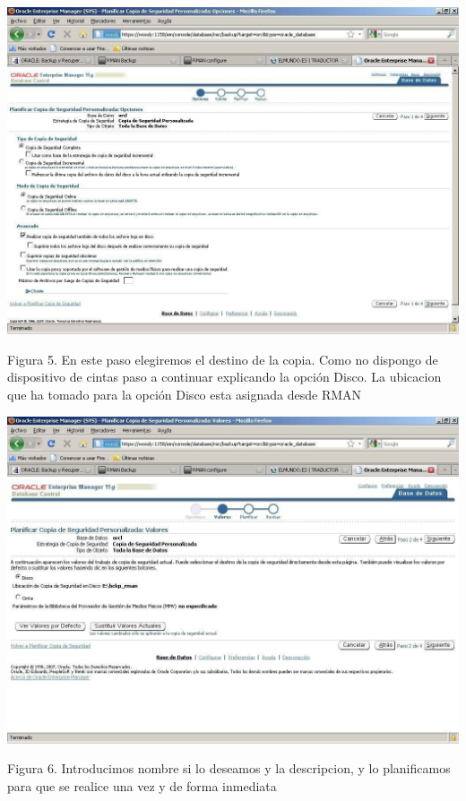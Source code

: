 \begin{enumerate}[1.]
\begin{center}
\includegraphics[width=15cm]{./Imagenes/eje1}
\end{center} 
Figura 5. En este paso elegiremos el destino de la copia. Como no dispongo de dispositivo de cintas paso a continuar explicando la opción Disco. La ubicacion que ha tomado para la opción Disco esta asignada desde RMAN
\begin{center}
\includegraphics[width=15cm]{./Imagenes/eje2}
\end{center}
Figura 6. Introducimos nombre si lo deseamos y la descripcion, y lo planificamos para que se realice una vez y de forma inmediata
\begin{center}

\end{center}
\end{enumerate}

